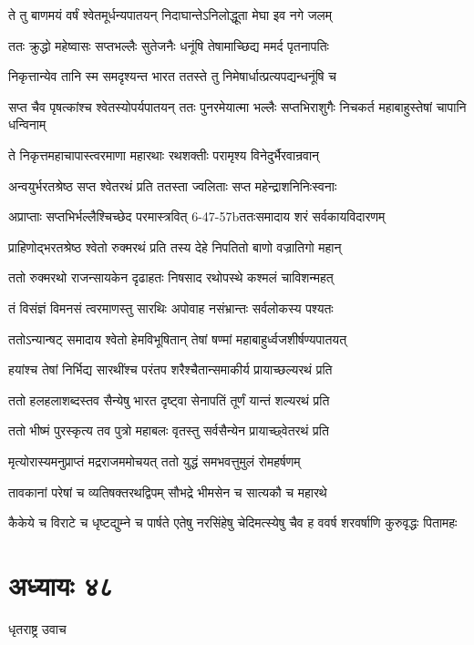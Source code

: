 \twolineshloka
{ते तु बाणमयं वर्षं श्वेतमूर्धन्यपातयन्}
{निदाघान्तेऽनिलोद्धूता मेघा इव नगे जलम्}


\twolineshloka
{ततः क्रुद्धो महेष्वासः सप्तभल्लैः सुतेजनैः}
{धनूंषि तेषामाच्छिद्य ममर्द पृतनापतिः}


\twolineshloka
{निकृत्तान्येव तानि स्म समदृश्यन्त भारत}
{ततस्ते तु निमेषार्धात्प्रत्यपद्यन्धनूंषि च}


\threelineshloka
{सप्त चैव पृषत्कांश्च श्वेतस्योपर्यपातयन्}
{ततः पुनरमेयात्मा भल्लैः सप्तभिराशुगैः}
{निचकर्त महाबाहुस्तेषां चापानि धन्विनाम्}


\twolineshloka
{ते निकृत्तमहाचापास्त्वरमाणा महारथाः}
{रथशक्तीः परामृश्य विनेदुर्भैरवान्रवान्}


\twolineshloka
{अन्वयुर्भरतश्रेष्ठ सप्त श्वेतरथं प्रति}
{ततस्ता ज्वलिताः सप्त महेन्द्राशनिनिःस्वनाः}


\twolineshloka
{अप्राप्ताः सप्तभिर्भल्लैश्चिच्छेद परमास्त्रवित्}
{6-47-57bततःसमादाय शरं सर्वकायविदारणम्}


\twolineshloka
{प्राहिणोद्भरतश्रेष्ठ श्वेतो रुक्मरथं प्रति}
{तस्य देहे निपतितो बाणो वज्रातिगो महान्}


\twolineshloka
{ततो रुक्मरथो राजन्सायकेन दृढाहतः}
{निषसाद रथोपस्थे कश्मलं चाविशन्महत्}


\twolineshloka
{तं विसंज्ञं विमनसं त्वरमाणस्तु सारथिः}
{अपोवाह नसंभ्रान्तः सर्वलोकस्य पश्यतः}


\twolineshloka
{ततोऽन्यान्षट् समादाय श्वेतो हेमविभूषितान्}
{तेषां षण्मां महाबाहुर्ध्वजशीर्षण्यपातयत्}


\twolineshloka
{हयांश्च तेषां निर्भिद्य सारथींश्च परंतप}
{शरैश्चैतान्समाकीर्य प्रायाच्छल्यरथं प्रति}


\twolineshloka
{ततो हलहलाशब्दस्तव सैन्येषु भारत}
{दृष्ट्वा सेनापतिं तूर्णं यान्तं शल्यरथं प्रति}


\twolineshloka
{ततो भीष्मं पुरस्कृत्य तव पुत्रो महाबलः}
{वृतस्तु सर्वसैन्येन प्रायाच्छ्वेतरथं प्रति}


\twolineshloka
{मृत्योरास्यमनुप्राप्तं मद्रराजममोचयत्}
{ततो युद्धं समभवत्तुमुलं रोमहर्षणम्}


\twolineshloka
{तावकानां परेषां च व्यतिषक्तरथद्विपम्}
{सौभद्रे भीमसेन च सात्यकौ च महारथे}


\threelineshloka
{कैकेये च विराटे च धृष्टद्युम्ने च पार्षते}
{एतेषु नरसिंहेषु चेदिमत्स्येषु चैव ह}
{ववर्ष शरवर्षाणि कुरुवृद्धः पितामहः}


\chapter{अध्यायः ४८}
\twolineshloka
{धृतराष्ट्र उवाच}
{}


